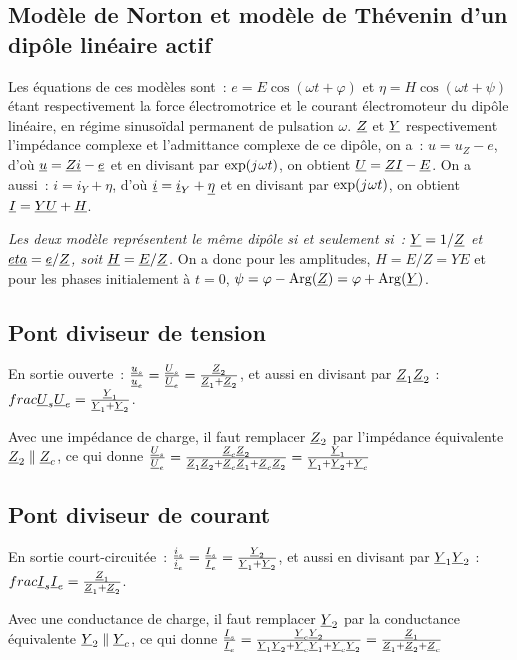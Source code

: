 \subsection{Modèle de Norton et modèle de Thévenin d'un dipôle linéaire  
actif}
Les équations de ces modèles sont~: \(e = E\cos(\omega t + \varphi)\) et 
\(\eta = H\cos(\omega t + \psi)\) étant respectivement la force 
électromotrice et le courant électromoteur du dipôle linéaire, en régime 
sinusoïdal permanent de pulsation \(\omega\). \(\underline{Z}\) et \(\underline{Y}\) 
respectivement l'impédance complexe et l'admittance complexe de ce 
dipôle, on a~: \(u = u_Z -e\), d'où \(\underline{u} = \underline{Z} \underline{i} -\underline{e}\) et 
en divisant par \(\exp({j\mkern1mu}\omega t)\), on obtient \(\underline{U} = \underline{Z} \underline{I} - 
\underline{E}\). On a aussi~: \(i = i_Y + \eta\), d'où \(\underline{i} = \underline{i}_Y + 
\underline{\eta}\) et en divisant par \(\exp({j\mkern1mu}\omega t)\), on obtient 
\(\underline{I} = \underline{Y} \underline{U} + \underline{H}\).

\emph{Les deux modèle représentent le même dipôle si et seulement si~: 
\(\underline{Y} = 1/\underline{Z}\) et \(\underline{eta} = \underline{e}/ \underline{Z}\), soit 
\(\underline{H} = \underline{E}/\underline{Z}\).} On a donc pour les amplitudes, 
\(H = E/Z = YE\) et pour les phases initialement à \(t=0\), \(\psi = 
\varphi - \operatorname{Arg}(\underline{Z}) = \varphi+\operatorname{Arg}(\underline{Y})\).
%
\subsection{Pont diviseur de tension}
En sortie ouverte~: \(\frac{\underline{u}_s}{\underline{u}_e} = \frac{\underline{U}_s}{\underline{U}_e} = 
\frac{\underline{Z}_2}{\underline{Z}_1+\underline{Z}_2}\), et aussi en divisant par \(\underline{Z}_1 \underline{Z}_2\) : 
\(frac{\underline{U}_s}{\underline{U}_e} = \frac{\underline{Y}_1}{\underline{Y}_1+\underline{Y}_2}\).

Avec une impédance de charge, il faut remplacer \(\underline{Z}_2\) par l'impédance 
équivalente \(\underline{Z}_2 \parallel \underline{Z}_c\), ce qui donne \(\frac{\underline{U}_s}{\underline{U}_e} 
= \frac{\underline{Z}_c \underline{Z}_2}{\underline{Z}_1\underline{Z}_2 + \underline{Z}_c\underline{Z}_1 + \underline{Z}_c\underline{Z}_2} = 
\frac{\underline{Y}_1}{\underline{Y}_1+\underline{Y}_2+\underline{Y}_c}\)
%
\subsection{Pont diviseur de courant}
En sortie court-circuitée~: \(\frac{\underline{i}_s}{\underline{i}_e} = \frac{\underline{I}_s}{\underline{I}_e} = 
\frac{\underline{Y}_2}{\underline{Y}_1+\underline{Y}_2}\), et aussi en divisant par \(\underline{Y}_1 \underline{Y}_2\) : 
\(frac{\underline{I}_s}{\underline{I}_e} = \frac{\underline{Z}_1}{\underline{Z}_1+\underline{Z}_2}\).

Avec une conductance de charge, il faut remplacer \(\underline{Y}_2\) par la 
conductance équivalente \(\underline{Y}_2 \parallel \underline{Y}_c\), ce qui donne 
\(\frac{\underline{I}_s}{\underline{I}_e} = \frac{\underline{Y}_c \underline{Y}_2}{\underline{Y}_1\underline{Y}_2 + \underline{Y}_c\underline{Y}_1 + 
\underline{Y}_c\underline{Y}_2} = \frac{\underline{Z}_1}{\underline{Z}_1+\underline{Z}_2+\underline{Z}_c}\)
\clearpage
